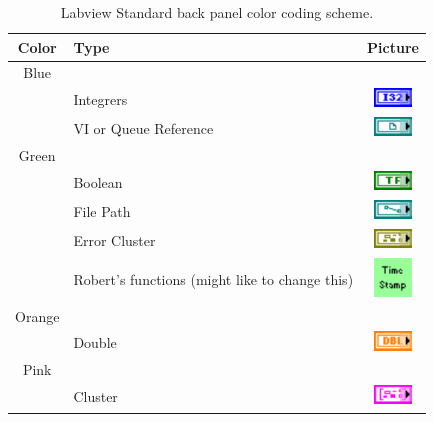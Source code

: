 \begin{table}[h]
\centering
\caption{Labview Standard back panel color coding scheme.}
\begin{tabular}{clc}
\hline\hline
Color	& Type								& Picture														\\
\hline
Blue		& 									& 															\\\hline
		& Integrers							& \includegraphics[height=0.2in]{Figures/ColorCoding_Int}				\\\hline
		& VI or Queue Reference					& \includegraphics[height=0.2in]{Figures/ColorCoding_VIReference}			\\\hline
Green	&									&															\\\hline
		& Boolean								& \includegraphics[height=0.2in]{Figures/ColorCoding_Bool}				\\\hline
		& File Path							& \includegraphics[height=0.2in]{Figures/ColorCoding_FilePath}			\\\hline
		& Error Cluster							& \includegraphics[height=0.2in]{Figures/ColorCoding_Error}				\\\hline
		& Robert's functions	(might like to change this) 	& \includegraphics[height=0.4in]{Figures/ColorCoding_Custom}			\\\hline
Orange	& 									& 															\\\hline
		& Double								& \includegraphics[height=0.2in]{Figures/ColorCoding_Float}				\\\hline
Pink		&									&															\\\hline
		& Cluster								& \includegraphics[height=0.2in]{Figures/ColorCoding_Cluster}				\\\hline

\end{tabular}
\end{table}
